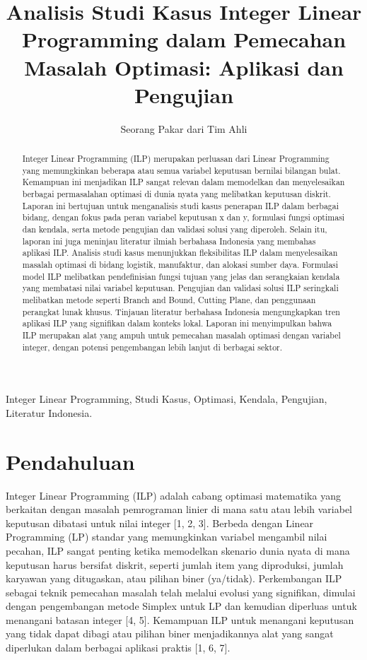 \documentclass{IEEEtran}
\begin{document}
\title{Analisis Studi Kasus Integer Linear Programming dalam Pemecahan Masalah Optimasi: Aplikasi dan Pengujian}

\author{Seorang Pakar dari Tim Ahli}

\maketitle

\begin{abstract}
Integer Linear Programming (ILP) merupakan perluasan dari Linear Programming yang memungkinkan beberapa atau semua variabel keputusan bernilai bilangan bulat. Kemampuan ini menjadikan ILP sangat relevan dalam memodelkan dan menyelesaikan berbagai permasalahan optimasi di dunia nyata yang melibatkan keputusan diskrit. Laporan ini bertujuan untuk menganalisis studi kasus penerapan ILP dalam berbagai bidang, dengan fokus pada peran variabel keputusan x dan y, formulasi fungsi optimasi dan kendala, serta metode pengujian dan validasi solusi yang diperoleh. Selain itu, laporan ini juga meninjau literatur ilmiah berbahasa Indonesia yang membahas aplikasi ILP. Analisis studi kasus menunjukkan fleksibilitas ILP dalam menyelesaikan masalah optimasi di bidang logistik, manufaktur, dan alokasi sumber daya. Formulasi model ILP melibatkan pendefinisian fungsi tujuan yang jelas dan serangkaian kendala yang membatasi nilai variabel keputusan. Pengujian dan validasi solusi ILP seringkali melibatkan metode seperti Branch and Bound, Cutting Plane, dan penggunaan perangkat lunak khusus. Tinjauan literatur berbahasa Indonesia mengungkapkan tren aplikasi ILP yang signifikan dalam konteks lokal. Laporan ini menyimpulkan bahwa ILP merupakan alat yang ampuh untuk pemecahan masalah optimasi dengan variabel integer, dengan potensi pengembangan lebih lanjut di berbagai sektor.
\end{abstract}
 \begin{IEEEkeywords}
  Integer Linear Programming, Studi Kasus, Optimasi, Kendala, Pengujian, Literatur Indonesia.
 \end{IEEEkeywords}

\section{Pendahuluan}

Integer Linear Programming (ILP) adalah cabang optimasi matematika yang berkaitan dengan masalah pemrograman linier di mana satu atau lebih variabel keputusan dibatasi untuk nilai integer [1, 2, 3]. Berbeda dengan Linear Programming (LP) standar yang memungkinkan variabel mengambil nilai pecahan, ILP sangat penting ketika memodelkan skenario dunia nyata di mana keputusan harus bersifat diskrit, seperti jumlah item yang diproduksi, jumlah karyawan yang ditugaskan, atau pilihan biner (ya/tidak). Perkembangan ILP sebagai teknik pemecahan masalah telah melalui evolusi yang signifikan, dimulai dengan pengembangan metode Simplex untuk LP dan kemudian diperluas untuk menangani batasan integer [4, 5]. Kemampuan ILP untuk menangani keputusan yang tidak dapat dibagi atau pilihan biner menjadikannya alat yang sangat diperlukan dalam berbagai aplikasi praktis [1, 6, 7].
\end{document}
